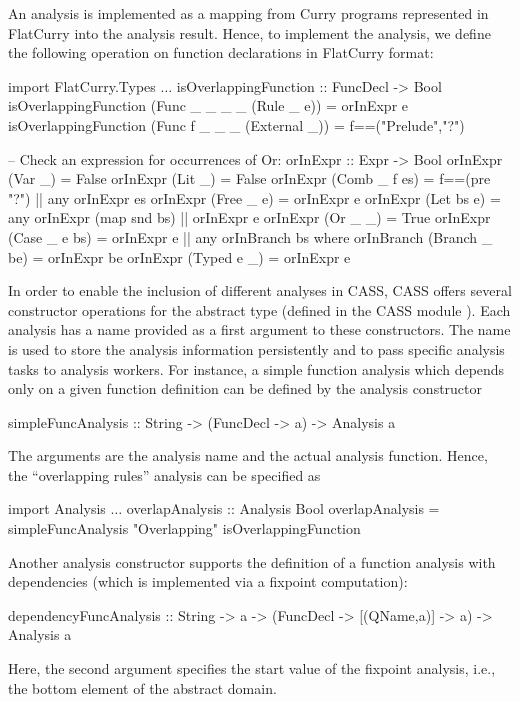An analysis is implemented as a mapping from Curry programs
represented in FlatCurry into the analysis result.
Hence, to implement the  analysis, we define
the following operation on function declarations in FlatCurry format:
\begin{curry}
import FlatCurry.Types
$\ldots$
isOverlappingFunction :: FuncDecl -> Bool
isOverlappingFunction (Func _ _ _ _ (Rule _ e))   = orInExpr e
isOverlappingFunction (Func f _ _ _ (External _)) = f==("Prelude","?")

-- Check an expression for occurrences of Or:
orInExpr :: Expr -> Bool
orInExpr (Var _)       = False
orInExpr (Lit _)       = False
orInExpr (Comb _ f es) = f==(pre "?") || any orInExpr es
orInExpr (Free _ e)    = orInExpr e
orInExpr (Let bs e)    = any orInExpr (map snd bs) || orInExpr e
orInExpr (Or _ _)      = True
orInExpr (Case _ e bs) = orInExpr e || any orInBranch bs
                   where orInBranch (Branch _ be) = orInExpr be
orInExpr (Typed e _)   = orInExpr e
\end{curry}
%
In order to enable the inclusion of different analyses in CASS,
CASS offers several constructor operations for the abstract type 
(defined in the CASS module ).
Each analysis has a name provided as a first argument
to these constructors. The name is used to store the
analysis information persistently and to pass specific analysis tasks
to analysis workers.
For instance, a simple function analysis which depends only on a
given function definition can be defined by the
analysis constructor
\begin{curry}
simpleFuncAnalysis :: String -> (FuncDecl -> a) -> Analysis a
\end{curry}
The arguments are the analysis name and the actual analysis function.
Hence, the ``overlapping rules'' analysis can be specified as
\begin{curry}
import Analysis
$\ldots$
overlapAnalysis :: Analysis Bool
overlapAnalysis = simpleFuncAnalysis "Overlapping" isOverlappingFunction
\end{curry}
Another analysis constructor supports the definition
of a function analysis with dependencies (which is implemented via a fixpoint
computation):
\begin{curry}
dependencyFuncAnalysis :: String -> a -> (FuncDecl -> [(QName,a)] -> a)
                       -> Analysis a
\end{curry}
Here, the second argument specifies the start value of the fixpoint analysis,
i.e., the bottom element of the abstract domain.

